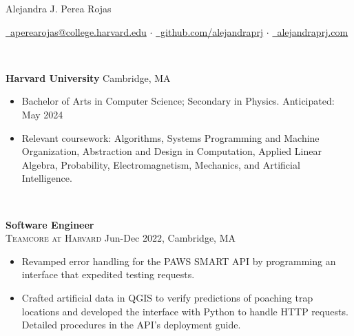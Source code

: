 \documentclass[11pt]{article}
\begin{document}
  \centerline{\Large{Alejandra J. Perea Rojas}}\vspace{1mm}

  \centerline{
    \href{mailto:aperearojas@college.harvard.edu}{\faEnvelopeO~aperearojas@college.harvard.edu} 
    $\cdot$ \href{https://github.com/alejandraprj}{\faGithub~github.com/alejandraprj}
    $\cdot$ \href{https://alejandraprj.com}{\faGlobe~alejandraprj.com}
  }\vspace{2mm}

  \vspace{-7pt}\\
  \noindent\makebox[\linewidth]{\rule{7.5in}{0.3pt}}

  \noindent \textbf{Harvard University} \hfill Cambridge, MA
    \begin{itemize}[itemsep=-.4em, leftmargin=1em]\vspace{-2mm}
        \item Bachelor of Arts in Computer Science; Secondary in Physics. \hfill Anticipated: May 2024
        \item Relevant coursework: 
          Algorithms, 
          Systems Programming and Machine Organization,
          Abstraction and Design in Computation, 
          Applied Linear Algebra, Probability,
          Electromagnetism, Mechanics, 
          and Artificial Intelligence.
    \end{itemize}

  \vspace{-7pt}\\
  \noindent\makebox[\linewidth]{\rule{7.5in}{0.3pt}}

    \noindent \textbf{Software Engineer}\\
    \textsc{{Teamcore at Harvard}} \hfill Jun-Dec 2022, Cambridge, MA
    \begin{itemize}[itemsep=-.4em, leftmargin=1em]\vspace{-2mm}
      \item Revamped error handling for the PAWS SMART API by programming an interface that expedited testing requests. 
      \item Crafted artificial data in QGIS to verify predictions of poaching trap locations and developed the interface with Python to handle HTTP requests. Detailed procedures in the API's deployment guide.
    \end{itemize}
    
\end{document}
